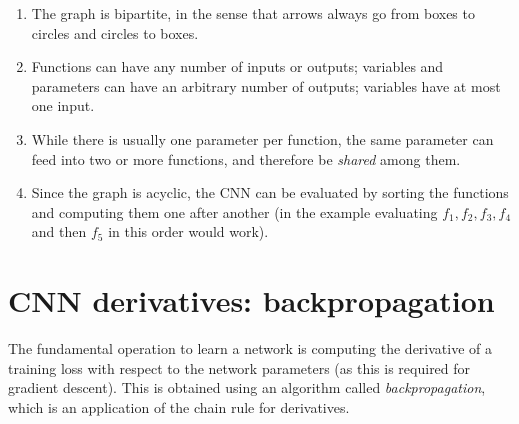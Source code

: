 \begin{enumerate}
\item The graph is bipartite, in the sense that arrows always go from boxes to circles and circles to boxes. 
\item Functions can have any number of inputs or outputs; variables and parameters can have an arbitrary number of outputs; variables have at most one input.
\item While there is usually one parameter per function, the same parameter can feed into two or more functions, and therefore be \emph{shared} among them.
\item Since the graph is acyclic, the CNN can be evaluated by sorting the functions and computing them one after another (in the example evaluating $f_1,f_2,f_3,f_4$ and then $f_5$ in this order would work).
\end{enumerate}

\section{CNN derivatives: backpropagation}\label{s:back}

The fundamental operation to learn a network is computing the derivative of a training loss with respect to the network parameters (as this is required for gradient descent). This is obtained using an algorithm called \emph{backpropagation}, which is an application of the chain rule for derivatives.

